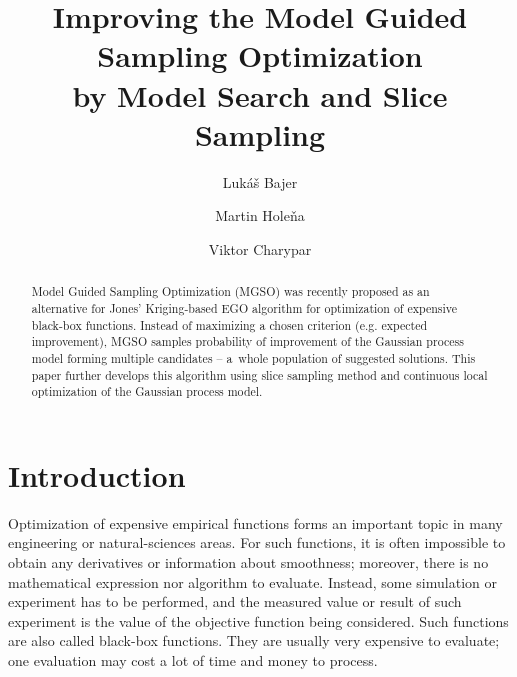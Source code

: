 \documentclass{itatnew}
\begin{document}
\title{Improving the Model Guided Sampling Optimization \\
  by Model Search and Slice Sampling}

\author{Lukáš Bajer \and Martin Holeňa \and Viktor Charypar }


\maketitle              %

\begin{abstract}
Model Guided Sampling Optimization (MGSO) was recently proposed as an alternative for Jones' Kriging-based EGO algorithm for optimization of expensive black-box functions. Instead of maximizing a chosen criterion (e.g. expected improvement), MGSO samples probability of improvement of the Gaussian process model forming multiple candidates -- a~whole population of suggested solutions. This paper further develops this algorithm using slice sampling method and continuous local optimization of the Gaussian process model.
\end{abstract}

\section{Introduction}
%
Optimization of expensive empirical functions forms an important topic in many engineering or natural-sciences areas. For such functions, it is often impossible to obtain any derivatives or information about smoothness; moreover, there is no mathematical expression nor algorithm to evaluate. Instead, some simulation or experiment has to be performed, and the measured value or result of such experiment is the value of the objective function being considered. Such functions are also called black-box functions. 
They are usually very expensive to evaluate; one evaluation may cost a lot of time and money to process.
\end{document}
